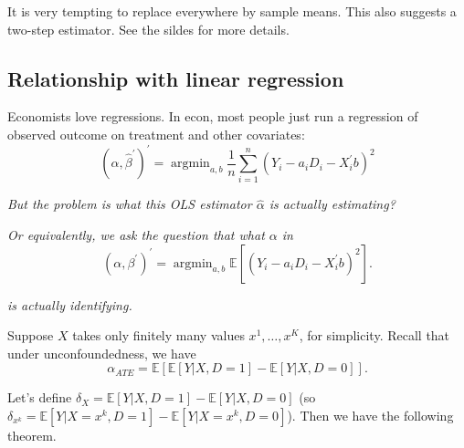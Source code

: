\documentclass[11pt,a4paper]{amsart}
\theoremstyle{plain}
\theoremstyle{definition}
\begin{document}
	It is very tempting to replace everywhere by sample means. This also suggests a two-step estimator. See the sildes for more details.
	
\subsection{Relationship with linear regression}\par 
	Economists love regressions. In econ, most people just run a regression of  observed outcome on treatment and other covariates:
	\[
	\left(\widehat{\alpha}, \widehat{\beta}^{\prime}\right)^{\prime}=\operatorname{argmin}_{a, b} \frac{1}{n} \sum_{i=1}^{n}\left(Y_{i}-a_{i}D_{i}-X_{i}^{\prime} b\right)^{2}
		\]
		
	\emph{But the problem is what this OLS estimator $\widehat{\alpha}$ is actually estimating?} \par 
	\emph{Or equivalently, we ask the question that what $\alpha$ in}
	\[		\left(\alpha, \beta^{\prime}\right)^{\prime}=\operatorname{argmin}_{a, b} \mathbb{E}\left[\left(Y_{i}-a_{i}D_{i}-X_{i}^{\prime} b\right)^{2}\right].	\]
	
	\emph{is actually identifying. }\par 
	Suppose $X$ takes only ﬁnitely many values $x^{1}, \dots, x^{K}$, for simplicity. Recall that under unconfoundedness, we have 
	\[		\alpha_{ATE}  =  \mathbb{E}[\mathbb{E}[Y|X,D=1] - \mathbb{E}[Y|X,D=0]].	\]
	
	Let's define $\delta_{X} = \mathbb{E}[Y|X,D=1] - \mathbb{E}[Y|X,D=0]$ (so $\delta_{x^{k}} = \mathbb{E}[Y|X=x^{k},D=1] - \mathbb{E}[Y|X=x^{k},D=0]$). Then we have the following theorem.
	
\end{document}
